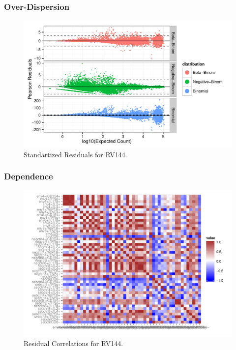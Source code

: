 \documentclass{beamer}
\theoremstyle{definition}
\begin{document}
\begin{frame}
\frametitle{Over-Dispersion}

\begin{figure}[]
\includegraphics[width=11 cm]{figures/presidualplot} \caption[Standartized Residuals for RV144]{Standartized Residuals for RV144.}
\end{figure}

\end{frame}


\begin{frame}
\frametitle{Dependence} 

\begin{figure}[]
\includegraphics[width=10 cm]{figures/correlationheatmap} \caption[Correlations for RV144]{Residual Correlations for RV144.}
\end{figure}

\end{frame}

\end{document}
